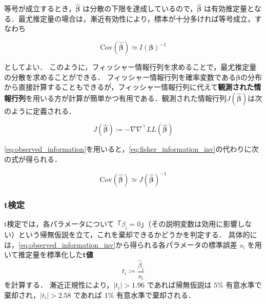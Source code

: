 等号が成立するとき，$\bm{\hat\beta}$ は分散の下限を達成しているので，$\bm{\hat\beta}$ は有効推定量となる．最尤推定量の場合は，漸近有効性により，標本が十分多ければ等号成立，すなわち

\begin{equation}
    \label{eq:fisher_information_inv}
    \mathrm{Cov}(\bm{\hat\beta}) \simeq I(\bm\beta)^{-1}
\end{equation}

としてよい．
このように，フィッシャー情報行列を求めることで，最尤推定量の分散を求めることができる．
フィッシャー情報行列を確率変数である$\bm\beta$の分布から直接計算することもできるが，フィッシャー情報行列に代えて\textbf{観測された情報行列}を用いる方が計算が簡単かつ有用である．観測された情報行列$J(\bm{\hat\beta})$は次のように定義される．

\begin{equation}
    \label{eq:observed_information}
    J(\bm{\hat\beta}) \coloneqq -\nabla\nabla^\top LL(\bm{\hat\beta})
\end{equation}

\eqref{eq:observed_information}を用いると，\eqref{eq:fisher_information_inv}の代わりに次の式が得られる．

\begin{equation}
    \label{eq:observed_information_inv}
    \mathrm{Cov}(\bm{\hat\beta}) \simeq J(\bm{\hat\beta})^{-1}
\end{equation}

\subsubsection{t検定}\label{ssec:interval_est}
t検定では，各パラメータについて「$\beta_i = 0$」（その説明変数は効用に影響しない）という帰無仮説を立て，これを棄却できるかどうかを判定する．
具体的には，\eqref{eq:observed_information_inv}から得られる各パラメータの標準誤差 $s_i$ を用いて推定量を標準化した\textbf{t値}
\begin{equation}
    t_i \coloneq \frac{\hat\beta_i}{s_i}
\end{equation}
を計算する．
漸近正規性により，$|t_i| > 1.96$ であれば帰無仮説は $5\%$ 有意水準で棄却され，$|t_i| > 2.58$ であれば $1\%$ 有意水準で棄却される．

